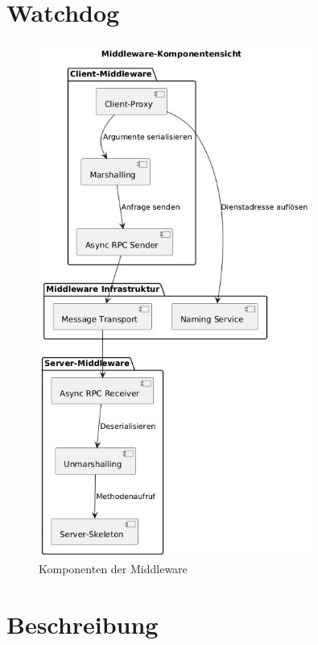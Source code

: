 \section{Watchdog}


\newcommand{\comment}[1]{}

\comment{
	@startuml
	title Middleware-Komponenten – Asynchrones RPC (ohne Anwendung)
	
	package "Client-Middleware" {
		[Client-Proxy]
		[Marshalling]
		[Async RPC Sender]
		
		
	}
	
	package "Middleware Infrastruktur" {
		[Naming Service]
		[Message Transport]
	}
	
	[Client-Proxy] --> [Naming Service] : Dienstadresse auflösen
	[Client-Proxy] --> [Marshalling] : Argumente serialisieren
	[Marshalling] --> [Async RPC Sender] : Anfrage senden
	package "Server-Middleware" {
		[Async RPC Receiver]
		[Unmarshalling]
		[Server-Skeleton]
		
		[Async RPC Receiver] --> [Unmarshalling] : Deserialisieren
		[Unmarshalling] --> [Server-Skeleton] : Methodenaufruf
	}
	
	
	[Async RPC Sender] --> [Message Transport]
	[Message Transport] --> [Async RPC Receiver]
	@enduml
}

\begin{figure}[htbp]
	\centering
	\includegraphics[width=0.8\textwidth]{diagrams/bausteinsicht.png}
	\caption{Komponenten der Middleware}
	\label{fig:meine-abbildung}
\end{figure}


\section*{Beschreibung}